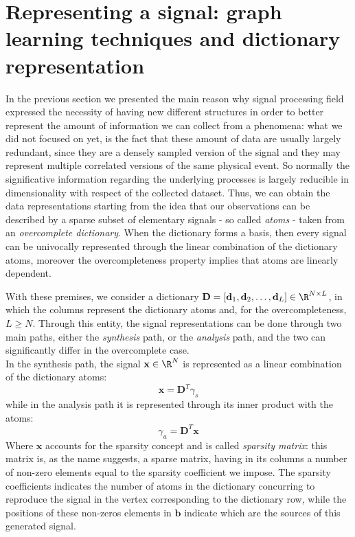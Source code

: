 \chapter{Representing a signal: graph learning techniques and dictionary representation}
In the previous section we presented the main reason why signal processing field expressed the necessity of having new different structures in order to better represent the amount of information we can collect from a phenomena: what we did not focused on yet, is the fact that these amount of data are usually largely redundant, since they are a densely sampled version of the signal and they may represent multiple correlated versions of the same physical event. So normally the significative information regarding the underlying processes is largely reducible in dimensionality with respect of the collected dataset. \cite{Tosic2011} Thus, we can obtain the data representations starting from the idea that our observations can be described by a sparse subset of elementary signals - so called \textit{atoms} - taken from an \textit{overcomplete dictionary}. When the dictionary forms a basis, then every signal can be univocally represented through the linear combination of the dictionary atoms, moreover the overcompleteness property implies that atoms are linearly dependent. \cite{Tosic2011} \cite{Rubinstein2010}

With these premises, we consider a dictionary $\textbf{D} = [\textbf{d}_1, \textbf{d}_2, \dots, \textbf{d}_L] \in \R^{N \times L}$, in which the columns represent the dictionary atoms and, for the overcompleteness, $L\geq N$. Through this entity, the signal representations can be done through two main paths, either the \textit{synthesis} path, or the \textit{analysis} path, and the two can significantly differ in the overcomplete case.\\
In the synthesis path, the signal $\textbf{x} \in \R^N$ is represented as a linear combination of the dictionary atoms:
\begin{equation}
\textbf{x} = \textbf{D}^T \gamma_s
\label{eq:synthesis}
\end{equation}
while in the analysis path it is represented through its inner product with the atoms:
\begin{equation}
\gamma_a = \textbf{D}^T \textbf{x}
\label{eq:analysis}
\end{equation}
Where $\textbf{x}$ accounts for the sparsity concept and is called \textit{sparsity matrix}: this matrix is, as the name suggests, a sparse matrix, having in its columns a number of non-zero elements equal to the sparsity coefficient we impose. The sparsity coefficients indicates the number of atoms in the dictionary concurring to reproduce the signal in the vertex corresponding to the dictionary row, while the positions of these non-zeros elements in $\textbf{b}$ indicate which are the sources of this generated signal.\\

